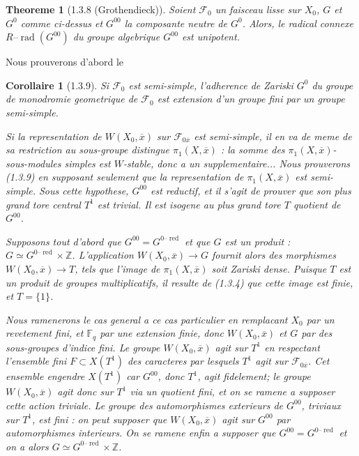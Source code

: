 \documentclass[12pt,a4paper]{article}
\theoremstyle{plain}
\newtheorem{corollaire}[theorem]{Corollaire}
\newtheorem{theoreme}{Theoreme}[section]
\theoremstyle{definition}
\theoremstyle{definition}
\theoremstyle{remark}
\DeclareMathOperator{\rad}{rad}
\DeclareMathOperator{\red}{red}
\begin{document}
\begin{theoreme}[1.3.8 (Grothendieck)]
Soient $\mathscr{F}_0$ un faisceau lisse sur $X_0$, $G$ et $G^0$ comme ci-dessus et $G^{00}$ la composante neutre de $G^0$. Alors, le radical connexe $R\text{--}\rad(G^{00})$ du groupe algebrique $G^{00}$ est unipotent.
\end{theoreme}

Nous prouverons d'abord le

\begin{corollaire}[1.3.9]
Si $\mathscr{F}_0$ est semi-simple, l'adherence de Zariski $G^0$ du groupe de monodromie geometrique de $\mathscr{F}_0$ est extension d'un groupe fini par un groupe semi-simple.

Si la representation de $W(X_0, \overline{x})$ sur $\mathscr{F}_{0\overline{x}}$ est semi-simple, il en va de meme de sa restriction au sous-groupe distingue $\pi_1(X, \overline{x})$ : la somme des $\pi_1(X, \overline{x})$-sous-modules simples est $W$-stable, donc a un supplementaire... Nous prouverons (1.3.9) en supposant seulement que la representation de $\pi_1(X, \overline{x})$ est semi-simple. Sous cette hypothese, $G^{00}$ est reductif, et il s'agit de prouver que son plus grand tore central $T^1$ est trivial. Il est isogene au plus grand tore $T$ quotient de $G^{00}$.

Supposons tout d'abord que $G^{00} = G^{0\text{--}\red}$ et que $G$ est un produit : $G \simeq G^{0\text{--}\red} \times \mathbb{Z}$. L'application $W(X_0, \overline{x}) \to G$ fournit alors des morphismes $W(X_0, \overline{x}) \to T$, tels que l'image de $\pi_1(X, \overline{x})$ soit Zariski dense. Puisque $T$ est un produit de groupes multiplicatifs, il resulte de (1.3.4) que cette image est finie, et $T = \{1\}$.

Nous ramenerons le cas general a ce cas particulier en remplacant $X_0$ par un revetement fini, et $\mathbb{F}_q$ par une extension finie, donc $W(X_0, \overline{x})$ et $G$ par des sous-groupes d'indice fini. Le groupe $W(X_0, \overline{x})$ agit sur $T^1$ en respectant l'ensemble fini $F \subset X(T^1)$ des caracteres par lesquels $T^1$ agit sur $\mathscr{F}_{0\overline{x}}$. Cet ensemble engendre $X(T^1)$ car $G^{00}$, donc $T^1$, agit fidelement; le groupe $W(X_0, \overline{x})$ agit donc sur $T^1$ via un quotient fini, et on se ramene a supposer cette action triviale. Le groupe des automorphismes exterieurs de $G^{00}$, triviaux sur $T^1$, est fini : on peut supposer que $W(X_0, \overline{x})$ agit sur $G^{00}$ par automorphismes interieurs. On se ramene enfin a supposer que $G^{00} = G^{0\text{--}\red}$ et on a alors $G \simeq G^{0\text{--}\red} \times \mathbb{Z}$.
\end{corollaire}
\end{document}
